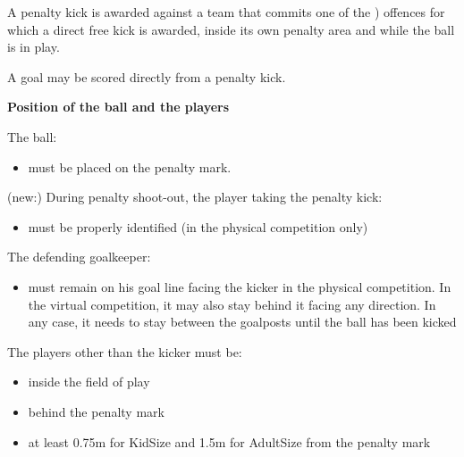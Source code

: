 \clearpage
\sffamily
{\bfseries \color[rgb]{0.4,0.4,0.4}{Law 14 -- The Penalty Kick}}
{}

\bigskip
A penalty kick is awarded against a team that commits one of the
) offences for which a direct free kick is awarded,
inside its own penalty area and while the ball is in play.

\bigskip

A goal may be scored directly from a penalty kick.

\bigskip


\bigskip

{\bfseries Position of the ball and the players }

\headlinebox

The ball:

\begin{itemize}
\item must be placed on the penalty mark.
\end{itemize}

(new:) During penalty shoot-out, the player taking the penalty kick:

\begin{itemize}
\item must be properly identified (in the physical competition only)
\end{itemize}


The defending goalkeeper:

\begin{itemize}
\item must remain on his goal line facing the kicker in the physical competition. In the virtual competition, it may also stay behind it facing any direction. In any case, it needs to stay between the goalposts until the ball has been kicked
\end{itemize}

The players other than the kicker must be:

\begin{itemize}
\item inside the field of play
\item behind the penalty mark
\item at least 0.75m for KidSize and 1.5m for AdultSize from the
      penalty mark 
\end{itemize}


